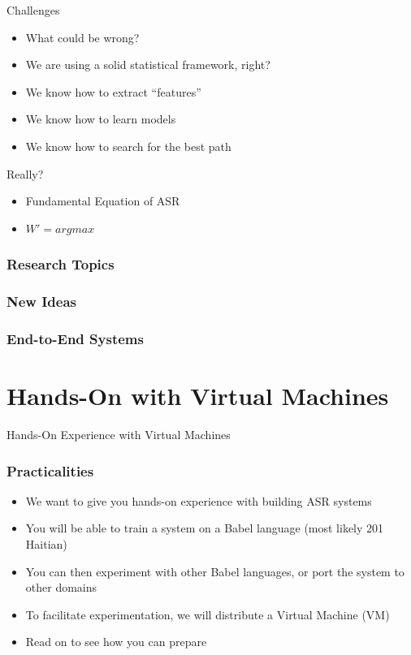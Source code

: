 \begin{frame}{Challenges}
  \begin{itemize}
  \item What could be wrong?
  \item We are using a solid statistical framework, right?
  \item We know how to extract ``features''
  \item We know how to learn models
  \item We know how to search for the best path
  \end{itemize}
\end{frame}

\begin{frame}{Really?}
  \begin{itemize}
  \item Fundamental Equation of ASR
  \item $W' = argmax$
  \end{itemize}
\end{frame}

\begin{frame}
  \frametitle{Research Topics}
\end{frame}

\begin{frame}
  \frametitle{New Ideas}
\end{frame}

\begin{frame}
  \frametitle{End-to-End Systems}
\end{frame}

\section{Hands-On with Virtual Machines}

\begin{frame}
  \begin{center}
    {\color{Maroon}\Huge Hands-On Experience with Virtual Machines\par}
  \end{center}
\end{frame}

\begin{frame}
  \frametitle{Practicalities}
  \begin{itemize}
  \item We want to give you hands-on experience with building ASR systems
  \item You will be able to train a system on a Babel language (most likely 201 Haitian)
  \item You can then experiment with other Babel languages, or port the system to other domains
  \item To facilitate experimentation, we will distribute a Virtual Machine (VM)
  \item {\color{Maroon}Read on to see how you can prepare}
  \end{itemize}
\end{frame}

